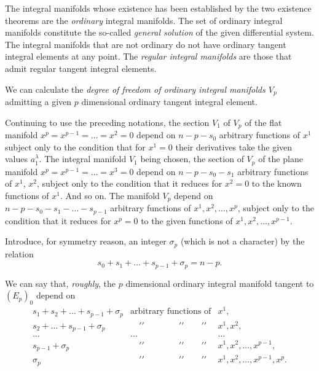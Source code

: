 \vspace{12pt}\fsec The integral manifolds whose existence has been established by the two existence theorems are the \emph{ordinary} integral manifolds. The set of ordinary integral manifolds constitute  the so-called \emph{general solution} of the given differential system. The integral manifolds that are not ordinary do not have ordinary tangent integral elements at any point. The \emph{regular integral manifolds} are those that admit regular tangent integral elements.

We can calculate the \emph{degree of freedom of  ordinary integral manifolds $V_{p}$} admitting a given $p$ dimensional ordinary tangent integral element.

Continuing to use the preceding notations, the section $V_{1}$ of $V_{p}$ of the flat manifold $x^{p}=x^{p-1}=\dots=x^{2}=0$ depend on $n-p-s_{0}$ arbitrary functions of $x^{1}$ subject only to the condition that for $x^{1}=0$ their derivatives take the given values $a_{1}^{\lambda}$. The integral manifold $V_{1}$ being chosen, the section of $V_{p}$ of the plane manifold $x^{p}=x^{p-1}=\dots=x^{3}=0$ depend on $n-p-s_{0}-s_{1}$ arbitrary functions of $x^{1}$, $x^{2}$, subject only to the condition that it reduces for $x^{2}=0$ to the known functions of $x^{1}$. And so on. The manifold $V_{p}$ depend on $n-p-s_{0}-s_{1}-\dots-s_{p-1}$ arbitrary functions of $x^{1},x^{2},\dots,x^{p}$, subject only to the condition that it reduces for $x^{p}=0$ to the given functions of $x^{1},x^{2},\dots,x^{p-1}$.

Introduce, for symmetry reason, an integer $\sigma_{p}$ (which is not a character) by the relation
\[
s_{0}+s_{1}+\dots+s_{p-1}+\sigma_{p}=n-p.
\]

We can say that, \emph{roughly}, the $p$ dimensional ordinary integral manifold tangent to $(E_{p})_{0}$ depend on
\[\begin{array}{rcl}
  s_{1}+s_{2}+\dots+s_{p-1}+\sigma_{p}&\text{arbitrary functions of}& x^{1},\\
  s_{2}+\dots+s_{p-1}+\sigma_{p}&\quad\prime\prime\qquad\qquad\prime\prime\qquad\prime \prime & x^{1},x^{2},\\
  \dots&\dots&\dots\\
  s_{p-1}+\sigma_{p}&\quad\prime\prime\qquad\qquad\prime\prime\qquad\prime \prime& x^{1},x^{2},\dots,x^{p-1},\\
  \sigma_{p}&\quad\prime\prime\qquad\qquad\prime\prime\qquad\prime \prime& x^{1},x^{2},\dots,x^{p-1},x^{p}.\\
\end{array}\]

